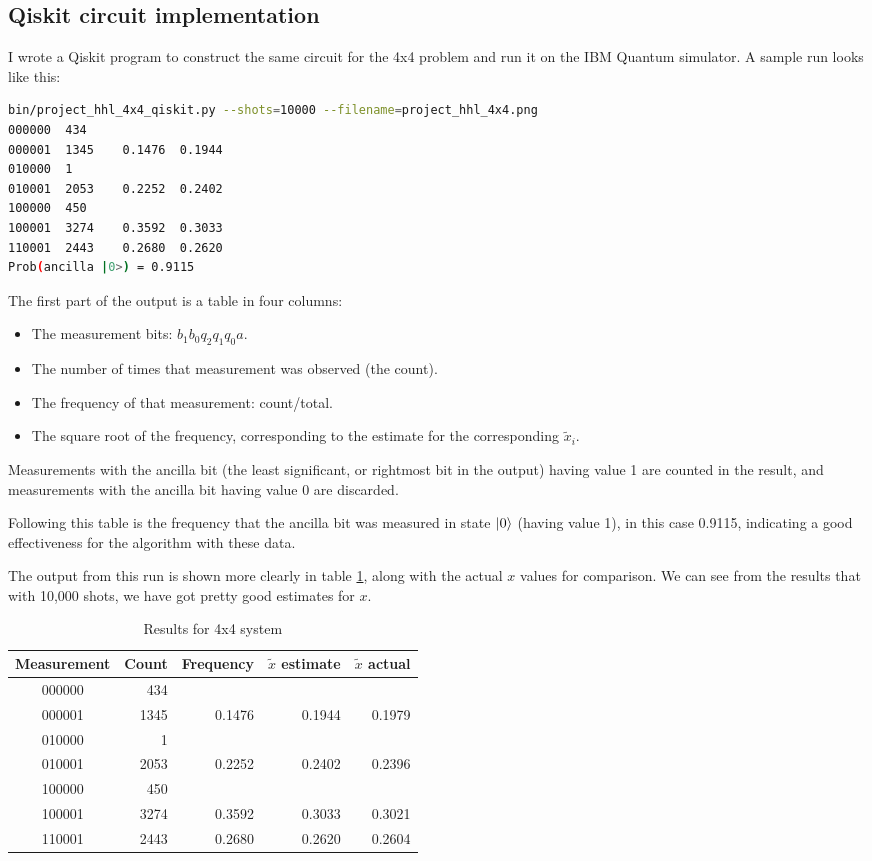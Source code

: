 \documentclass[12pt]{extarticle}
\begin{document}
\subsection{Qiskit circuit implementation}

I wrote a Qiskit program to construct the same circuit for the 4x4 problem and run it on the IBM Quantum simulator.
A sample run looks like this:

\begin{lstlisting}[language=Bash]
bin/project_hhl_4x4_qiskit.py --shots=10000 --filename=project_hhl_4x4.png
000000  434
000001  1345    0.1476  0.1944
010000  1
010001  2053    0.2252  0.2402
100000  450
100001  3274    0.3592  0.3033
110001  2443    0.2680  0.2620
Prob(ancilla |0>) = 0.9115
\end{lstlisting}

The first part of the output is a table in four columns:
\begin{itemize}
\item The measurement bits: $b_1b_0q_2q_1q_0a$.
\item The number of times that measurement was observed (the count).
\item The frequency of that measurement: count/total.
\item The square root of the frequency, corresponding to the estimate for the corresponding $\tilde{x}_i$.
\end{itemize}

Measurements with the ancilla bit (the least significant, or rightmost bit in the output) having value 1 are counted in the result,
and measurements with the ancilla bit having value 0 are discarded.

Following this table is the frequency that the ancilla bit was measured in state $\ket{0}$ (having value 1), in this case 0.9115,
indicating a good effectiveness for the algorithm with these data.

The output from this run is shown more clearly in table \ref{tab:results4x4}, along with the actual $x$ values for comparison.
We can see from the results that with 10,000 shots, we have got pretty good estimates for $x$.

\begin{table}[h]
\begin{center}
\begin{tabular}{|c|r|r|r|r|}
\hline
Measurement & Count & Frequency & $\tilde{x}$ estimate & $\tilde{x}$ actual \\
\hline
000000 &  434 & & & \\
000001 & 1345 & 0.1476 & 0.1944 & 0.1979 \\
010000 &    1 & & & \\
010001 & 2053 & 0.2252 & 0.2402 & 0.2396 \\
100000 &  450 & & & \\
100001 & 3274 & 0.3592 & 0.3033 & 0.3021 \\
110001 & 2443 & 0.2680 & 0.2620 & 0.2604 \\
\hline
\end{tabular}
\caption{Results for 4x4 system}
\label{tab:results4x4}
\end{center}
\end{table}
\end{document}
